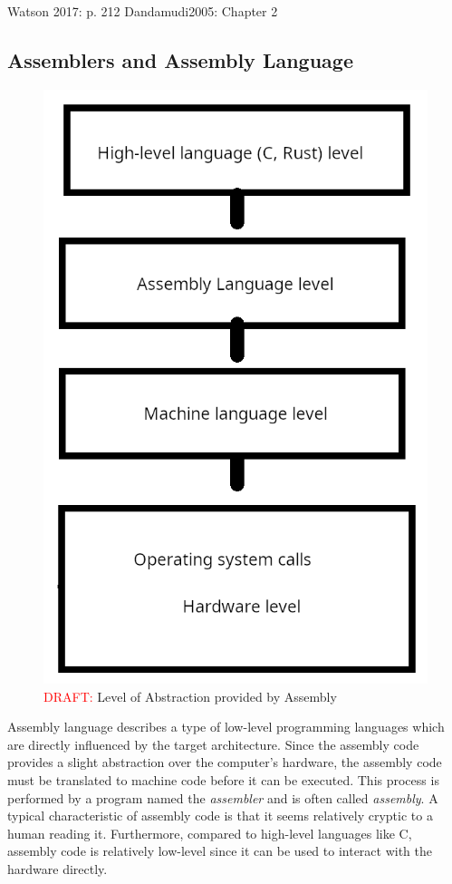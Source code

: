Watson 2017: p. 212
Dandamudi2005: Chapter 2

\subsection{Assemblers and Assembly Language}

\begin{figure}
    \centering
	\includegraphics[width=.25\textwidth]{./abstractions_draft.png}
	\caption{\textcolor{red}{DRAFT:} Level of Abstraction provided by Assembly}\label{fig:abstractions}
\end{figure}

Assembly language describes a type of low-level programming languages which are directly influenced by the target architecture.
Since the assembly code provides a slight abstraction over the computer's hardware,
the assembly code must be translated to machine code before it can be executed.
This process is performed by a program named the \emph{assembler} and is often called \emph{assembly}.
A typical characteristic of assembly code is that it seems relatively cryptic to a human reading it.
Furthermore, compared to high-level languages like C, assembly code is relatively low-level since it can be used to interact with the hardware directly.

